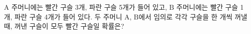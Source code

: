 $\mathrm{A}$ 주머니에는 빨간 구슬 3개, 파란 구슬 5개가 들어 있고, $\mathrm{B}$ 주머니에는 빨간 구슬 1개, 파란 구슬 4개가 들어 있다. 두 주머니 $\mathrm{A}$, $\mathrm{B}$에서 임의로 각각 구슬을 한 개씩 꺼낼 때, 꺼낸 구슬이 모두 빨간 구슬일 확률은?
